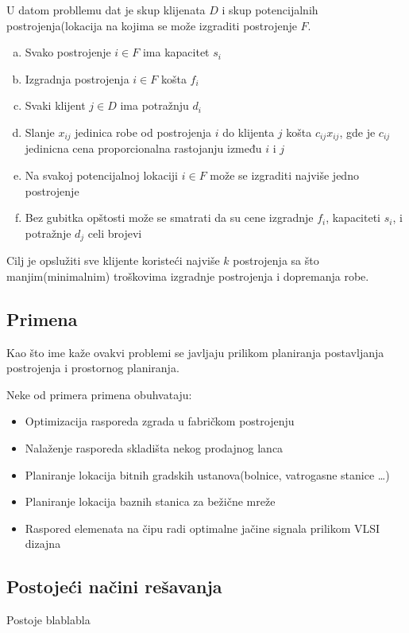 \documentclass[a4paper]{article}
\begin{document}
U datom probllemu dat je skup klijenata $D$ i skup potencijalnih postrojenja(lokacija na kojima se može izgraditi postrojenje $F$.
\begin{enumerate}[a)]
\item Svako postrojenje $i \in F$ ima kapacitet $s_i$
\item Izgradnja postrojenja $i \in F$ košta $f_i$
\item Svaki klijent $j \in D$ ima potražnju $d_i$
\item Slanje $x_{ij}$ jedinica robe od postrojenja $i$ do klijenta $j$ košta $c_{ij}x_{ij}$, gde je $c_{ij}$ jedinicna cena proporcionalna rastojanju između $i$ i $j$
\item Na svakoj potencijalnoj lokaciji $i \in F$ može se izgraditi najviše jedno postrojenje
\item Bez gubitka opštosti može se smatrati da su cene izgradnje $f_i$, kapaciteti $s_i$, i potražnje $d_j$ celi brojevi

\end{enumerate}
Cilj je opslužiti sve klijente koristeći najviše $k$ postrojenja sa što manjim(minimalnim) troškovima izgradnje postrojenja i dopremanja robe.

\subsection{Primena}

Kao što ime kaže ovakvi problemi se javljaju prilikom planiranja postavljanja postrojenja i prostornog planiranja.

Neke od primera primena obuhvataju\cite{tokyo}:
\begin{itemize}
\item  Optimizacija rasporeda zgrada u fabričkom postrojenju
\item Nalaženje rasporeda skladišta nekog prodajnog lanca
\item Planiranje lokacija bitnih gradskih ustanova(bolnice, vatrogasne stanice \ldots)
\item Planiranje lokacija baznih stanica za bežične mreže
\item Raspored elemenata na čipu radi optimalne jačine signala prilikom VLSI dizajna
\end{itemize}

\subsection{Postojeći načini rešavanja}

Postoje blablabla\cite{Silva}


\appendix
 

\end{document}
